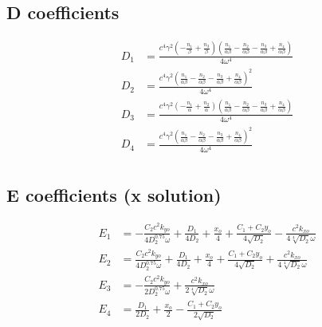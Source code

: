 \documentclass[11pt]{article}
\begin{document}
\subsection*{D coefficients}
\begin{align*}
D_{1} &= \frac{c^{4} \gamma^{2} \left(- \frac{n_{1}}{\beta} + \frac{n_{3}}{\beta}\right) \left(\frac{n_{1}}{\alpha \beta} - \frac{n_{2}}{\alpha \beta} - \frac{n_{3}}{\alpha \beta} + \frac{n_{4}}{\alpha \beta}\right)}{4 \omega^{4}}
\tag{10a} \\
D_{2} &= \frac{c^{4} \gamma^{2} \left(\frac{n_{1}}{\alpha \beta} - \frac{n_{2}}{\alpha \beta} - \frac{n_{3}}{\alpha \beta} + \frac{n_{4}}{\alpha \beta}\right)^{2}}{4 \omega^{4}}
\tag{10b} \\
D_{3} &= \frac{c^{4} \gamma^{2} \left(- \frac{n_{1}}{\alpha} + \frac{n_{2}}{\alpha}\right) \left(\frac{n_{1}}{\alpha \beta} - \frac{n_{2}}{\alpha \beta} - \frac{n_{3}}{\alpha \beta} + \frac{n_{4}}{\alpha \beta}\right)}{4 \omega^{4}} \tag{10c} \\
D_{4} &= \frac{c^{4} \gamma^{2} \left(\frac{n_{1}}{\alpha \beta} - \frac{n_{2}}{\alpha \beta} - \frac{n_{3}}{\alpha \beta} + \frac{n_{4}}{\alpha \beta}\right)^{2}}{4 \omega^{4}} \tag{10d} \\
\end{align*}

\subsection*{E coefficients (x solution)}
\begin{align*}
E_{1} &= - \frac{C_{2} c^{2} k_{yo}}{4 D_{2}^{0.75} \omega} + \frac{D_{1}}{4 D_{2}} + \frac{x_{o}}{4} + \frac{C_{1} + C_{2} y_{o}}{4 \sqrt{D_{2}}} - \frac{c^{2} k_{xo}}{4 \sqrt[4]{D_{2}} \omega} \tag{11a}\\
E_{2} &= \frac{C_{2} c^{2} k_{yo}}{4 D_{2}^{0.75} \omega} + \frac{D_{1}}{4 D_{2}} + \frac{x_{o}}{4} + \frac{C_{1} + C_{2} y_{o}}{4 \sqrt{D_{2}}} + \frac{c^{2} k_{xo}}{4 \sqrt[4]{D_{2}} \omega} \tag{11b}\\
E_{3} &= - \frac{C_{2} c^{2} k_{yo}}{2 D_{2}^{0.75} \omega} + \frac{c^{2} k_{xo}}{2 \sqrt[4]{D_{2}} \omega}
\tag{11c}\\
E_{4} &= \frac{D_{1}}{2 D_{2}} + \frac{x_{o}}{2} - \frac{C_{1} + C_{2} y_{o}}{2 \sqrt{D_{2}}} \tag{11d}\\
\end{align*}
\end{document}
